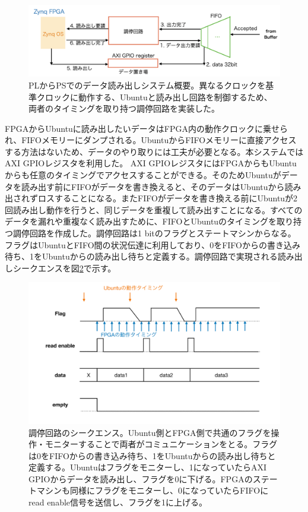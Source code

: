 \begin{figure} 
\centering
\includegraphics[width=16cm]{fig/QAQC/JATHubarbitator.png}
\caption[PLからPSでのデータ読み出しシステム概要]{PLからPSでのデータ読み出しシステム概要。異なるクロックを基準クロックに動作する、Ubuntuと読み出し回路を制御するため、両者のタイミングを取り持つ調停回路を実装した。}
\label{JATHubarbitor}
\end{figure}

FPGAからUbuntuに読み出したいデータはFPGA内の動作クロックに乗せられ、FIFOメモリーにダンプされる。UbuntuからFIFOメモリーに直接アクセスする方法はないため、データのやり取りには工夫が必要となる。本システムではAXI GPIOレジスタを利用した。
AXI GPIOレジスタにはFPGAからもUbuntuからも任意のタイミングでアクセスすることができる。そのためUbuntuがデータを読み出す前にFIFOがデータを書き換えると、そのデータはUbuntuから読み出されずロスすることになる。またFIFOがデータを書き換える前にUbuntuが2回読み出し動作を行うと、同じデータを重複して読み出すことになる。すべてのデータを漏れや重複なく読み出すために、FIFOとUbuntuのタイミングを取り持つ調停回路を作成した。調停回路は1 bitのフラグとステートマシンからなる。フラグはUbuntuとFIFO間の状況伝達に利用しており、0をFIFOからの書き込み待ち、1をUbuntuからの読み出し待ちと定義する。調停回路で実現される読み出しシークエンスを図\ref{JATHubarbitation}で示す。
\begin{figure} 
\centering
\includegraphics[width=16cm]{fig/QAQC/JATHubarbitation.pdf}
\caption[調停回路のシークエンス]{調停回路のシークエンス。Ubuntu側とFPGA側で共通のフラグを操作・モニターすることで両者がコミュニケーションをとる。フラグは0をFIFOからの書き込み待ち、1をUbuntuからの読み出し待ちと定義する。Ubuntuはフラグをモニターし、1になっていたらAXI GPIOからデータを読み出し、フラグを0に下げる。FPGAのステートマシンも同様にフラグをモニターし、0になっていたらFIFOにread enable信号を送信し、フラグを1に上げる。}
\label{JATHubarbitation}
\end{figure}

